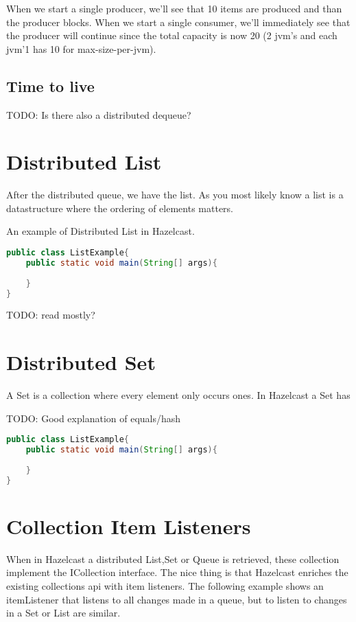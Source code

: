 When we start a single producer, we'll see that 10 items are produced and than the producer
blocks. When we start a single consumer, we'll immediately see that the producer will continue
since the total capacity is now 20 (2 jvm's and each jvm'1 has 10 for max-size-per-jvm). 

\subsection{Time to live}
TODO: Is there also a distributed dequeue?

\section{Distributed List}

After the distributed queue, we have the list. As you most likely know a list is a 
datastructure where the ordering of elements matters. 

An example of Distributed List in Hazelcast.

\begin{lstlisting}[language=java]
public class ListExample{
    public static void main(String[] args){
	
    }
}
\end{lstlisting}

TODO: read mostly?

\section{Distributed Set}

A Set is a collection where every element only occurs ones. In Hazelcast a Set has 

TODO: Good explanation of equals/hash

\begin{lstlisting}[language=java]
public class ListExample{
    public static void main(String[] args){
	
    }
}
\end{lstlisting}


\section{Collection Item Listeners}

When in Hazelcast a distributed List,Set or Queue is retrieved, these collection implement
the ICollection interface. The nice thing is that Hazelcast enriches the existing collections api
with item listeners. The following example shows an itemListener that listens to all changes made
in a queue, but to listen to changes in a Set or List are similar.

